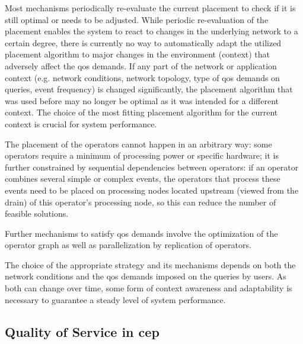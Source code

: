 Most mechanisms periodically re-evaluate the current placement to check if it is still optimal or needs to be adjusted. While periodic re-evaluation of the placement enables the system to react to changes in the underlying network to a certain degree, there is currently no way to automatically adapt the utilized placement algorithm to major changes in the environment (context) that adversely affect the \gls{qos} demands.
If any part of the network or application context (e.g. network conditions, network topology, type of \gls{qos} demands on queries, event frequency) is changed significantly, the placement algorithm that was used before may no longer be optimal as it was intended for a different context.
The choice of the most fitting placement algorithm for the current context is crucial for system performance. 

The placement of the operators cannot happen in an arbitrary way: some operators require a minimum of processing power or specific hardware; it is further constrained by sequential dependencies between operators: if an operator combines several simple or complex events, the operators that process these events need to be placed on processing nodes located upstream (viewed from the drain) of this operator's processing node, so this can reduce the number of feasible solutions. 

Further mechanisms to satisfy \gls{qos} demands involve the optimization of the operator graph as well as parallelization by replication of operators.

The choice of the appropriate strategy and its mechanisms depends on both the network conditions and the \gls{qos} demands imposed on the queries by users. As both can change over time, some form of context awareness and adaptability is necessary to guarantee a steady level of system performance.


\subsection{Quality of Service in \gls{cep}}



